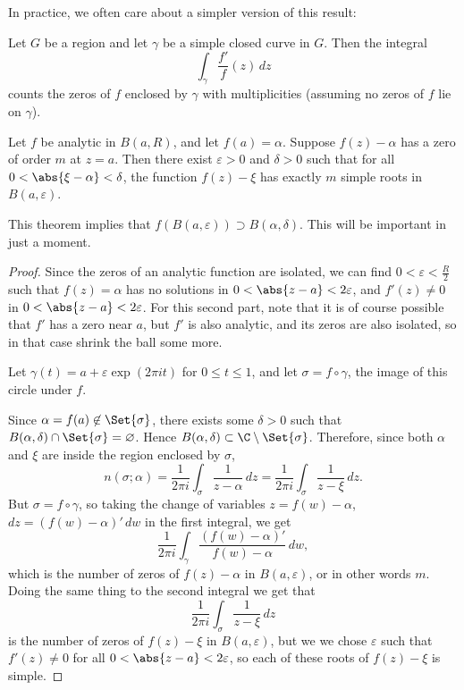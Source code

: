 In practice, we often care about a simpler version of this result:

\begin{corollary}
	Let $G$ be a region and let $\gamma$ be a simple closed curve in $G$.
	Then the integral
	\[
		\int_\gamma \frac{f'}{f}(z) \, d z
	\]
	counts the zeros of $f$ enclosed by $\gamma$ with multiplicities (assuming no zeros of $f$ lie on $\gamma$).
\end{corollary}

\begin{theorem}\label{thm4.10}
	Let $f$ be analytic in $B(a, R)$, and let $f(a) = \alpha$.
	Suppose $f(z) - \alpha$ has a zero of order $m$ at $z = a$.
	Then there exist $\varepsilon > 0$ and $\delta > 0$ such that for all $0 < \abs{\xi - \alpha} < \delta$, the function $f(z) - \xi$ has exactly $m$ simple roots in $B(a, \varepsilon)$.
\end{theorem}

\begin{remark}
	This theorem implies that $f(B(a, \varepsilon)) \supset B(\alpha, \delta)$.
	This will be important in just a moment.
\end{remark}

\begin{proof}
	Since the zeros of an analytic function are isolated, we can find $0 < \varepsilon < \frac{R}{2}$ such that $f(z) = \alpha$ has no solutions in $0 < \abs{z - a} < 2 \varepsilon$, and $f'(z) \neq 0$ in $0 < \abs{z - a} < 2 \varepsilon$.
	For this second part, note that it is of course possible that $f'$ has a zero near $a$, but $f'$ is also analytic, and its zeros are also isolated, so in that case shrink the ball some more.

	Let $\gamma(t) = a + \varepsilon \exp(2 \pi i t)$ for $0 \leq t \leq 1$, and let $\sigma = f \circ \gamma$, the image of this circle under $f$.

	Since $\alpha = f(a) \not\in \Set{\sigma}$, there exists some $\delta > 0$ such that $B(\alpha, \delta) \cap \Set{\sigma} = \varnothing$.
	Hence $B(\alpha, \delta) \subset \C \setminus \Set{\sigma}$.
	Therefore, since both $\alpha$ and $\xi$ are inside the region enclosed by $\sigma$,
	\[
		n(\sigma; \alpha) = \frac{1}{2 \pi i} \int_\sigma \frac{1}{z - \alpha} \, d z = \frac{1}{2 \pi i} \int_\sigma \frac{1}{z - \xi} \, d z.
	\]
	But $\sigma = f \circ \gamma$, so taking the change of variables $z = f(w) - \alpha$, $d z = (f(w) - \alpha)' \, d w$ in the first integral, we get
	\[
		\frac{1}{2 \pi i} \int_\gamma \frac{(f(w) - \alpha)'}{f(w) - \alpha} \, d w ,
	\]
	which is the number of zeros of $f(z) - \alpha$ in $B(a, \varepsilon)$, or in other words $m$.
	Doing the same thing to the second integral we get that
	\[
		\frac{1}{2 \pi i} \int_\sigma \frac{1}{z - \xi} \, d z
	\]
	is the number of zeros of $f(z) - \xi$ in $B(a, \varepsilon)$, but we we chose $\varepsilon$ such that $f'(z) \neq 0$ for all $0 < \abs{z - a} < 2 \varepsilon$, so each of these roots of $f(z) - \xi$ is simple.
\end{proof}

